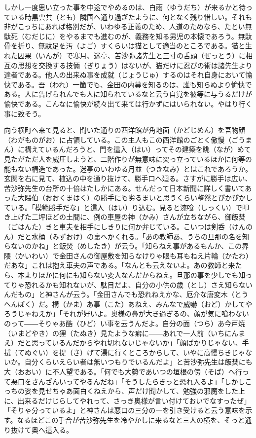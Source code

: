 \documentclass{book}
\begin{document}
しかし一度思い立った事を中途でやめるのは、白雨（ゆうだち）が来るかと待っている時黒雲共（とも）隣国へ通り過ぎたように、何となく残り惜しい。それも非がこっちにあれば格別だが、いわゆる正義のため、人道のためなら、たとい無駄死（むだじに）をやるまでも進むのが、義務を知る男児の本懐であろう。無駄骨を折り、無駄足を汚（よご）すくらいは猫として適当のところである。猫と生れた因果（いんが）で寒月、迷亭、苦沙弥諸先生と三寸の舌頭（ぜっとう）に相互の思想を交換する技倆（ぎりょう）はないが、猫だけに忍びの術は諸先生より達者である。他人の出来ぬ事を成就（じょうじゅ）するのはそれ自身において愉快である。吾（われ）一箇でも、金田の内幕を知るのは、誰も知らぬより愉快である。人に告げられんでも人に知られているなと云う自覚を彼等に与うるだけが愉快である。こんなに愉快が続々出て来ては行かずにはいられない。やはり行く事に致そう。

向う横町へ来て見ると、聞いた通りの西洋館が角地面（かどじめん）を吾物顔（わがものがお）に占領している。この主人もこの西洋館のごとく傲慢（ごうまん）に構えているんだろうと、門を這入（はい）ってその建築を眺（なが）めて見たがただ人を威圧しようと、二階作りが無意味に突っ立っているほかに何等の能もない構造であった。迷亭のいわゆる月並（つきなみ）とはこれであろうか。玄関を右に見て、植込の中を通り抜けて、勝手口へ廻る。さすがに勝手は広い、苦沙弥先生の台所の十倍はたしかにある。せんだって日本新聞に詳しく書いてあった大隈伯（おおくまはく）の勝手にも劣るまいと思うくらい整然とぴかぴかしている。「模範勝手だな」と這入（はい）り込む。見ると漆喰（しっくい）で叩き上げた二坪ほどの土間に、例の車屋の神（かみ）さんが立ちながら、御飯焚（ごはんた）きと車夫を相手にしきりに何か弁じている。こいつは剣呑（けんのん）だと水桶（みずおけ）の裏へかくれる。「あの教師あ、うちの旦那の名を知らないのかね」と飯焚（めしたき）が云う。「知らねえ事があるもんか、この界隈（かいわい）で金田さんの御屋敷を知らなけりゃ眼も耳もねえ片輪（かたわ）だあな」これは抱え車夫の声である。「なんとも云えないよ。あの教師と来たら、本よりほかに何にも知らない変人なんだからねえ。旦那の事を少しでも知ってりゃ恐れるかも知れないが、駄目だよ、自分の小供の歳（とし）さえ知らないんだもの」と神さんが云う。「金田さんでも恐れねえかな、厄介な唐変木（とうへんぼく）だ。構（かま）あ事（こた）あねえ、みんなで威嚇（おど）かしてやろうじゃねえか」「それが好いよ。奥様の鼻が大き過ぎるの、顔が気に喰わないのって――そりゃあ酷（ひど）い事を云うんだよ。自分の面（つら）あ今戸焼（いまどやき）の狸（たぬき）見たような癖に――あれで一人前（いちにんまえ）だと思っているんだからやれ切れないじゃないか」「顔ばかりじゃない、手拭（てぬぐい）を提（さ）げて湯に行くところからして、いやに高慢ちきじゃないか。自分くらいえらい者は無いつもりでいるんだよ」と苦沙弥先生は飯焚にも大（おおい）に不人望である。「何でも大勢であいつの垣根の傍（そば）へ行って悪口をさんざんいってやるんだね」「そうしたらきっと恐れ入るよ」「しかしこっちの姿を見せちゃあ面白くねえから、声だけ聞かして、勉強の邪魔をした上に、出来るだけじらしてやれって、さっき奥様が言い付けておいでなすったぜ」「そりゃ分っているよ」と神さんは悪口の三分の一を引き受けると云う意味を示す。なるほどこの手合が苦沙弥先生を冷やかしに来るなと三人の横を、そっと通り抜けて奥へ這入る。
\end{document}
